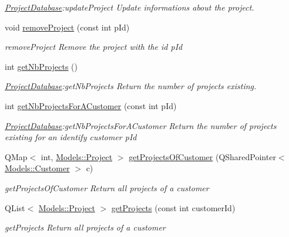 \begin{DoxyCompactItemize}
\begin{DoxyCompactList}\small\item\em \hyperlink{classDatabases_1_1ProjectDatabase}{Project\+Database}\+:update\+Project Update informations about the project. \end{DoxyCompactList}\item 
void \hyperlink{classDatabases_1_1ProjectDatabase_abdd5fcb1913c2d2f375a658f6656c522}{remove\+Project} (const int p\+Id)
\begin{DoxyCompactList}\small\item\em remove\+Project Remove the project with the id \textquotesingle{}p\+Id\textquotesingle{} \end{DoxyCompactList}\item 
int \hyperlink{classDatabases_1_1ProjectDatabase_aa486ad21f156a8ba7d08baef29e0aaea}{get\+Nb\+Projects} ()
\begin{DoxyCompactList}\small\item\em \hyperlink{classDatabases_1_1ProjectDatabase}{Project\+Database}\+:get\+Nb\+Projects Return the number of projects existing. \end{DoxyCompactList}\item 
int \hyperlink{classDatabases_1_1ProjectDatabase_a9e9a1fb58e4e90fcc568d1c171b863ff}{get\+Nb\+Projects\+For\+A\+Customer} (const int p\+Id)
\begin{DoxyCompactList}\small\item\em \hyperlink{classDatabases_1_1ProjectDatabase}{Project\+Database}\+:get\+Nb\+Projects\+For\+A\+Customer Return the number of projects existing for an identify customer {\itshape p\+Id} \end{DoxyCompactList}\item 
Q\+Map$<$ int, \hyperlink{classModels_1_1Project}{Models\+::\+Project} $>$ \hyperlink{classDatabases_1_1ProjectDatabase_acf044f95bd4df4e04bff9ef52d326704}{get\+Projects\+Of\+Customer} (Q\+Shared\+Pointer$<$ \hyperlink{classModels_1_1Customer}{Models\+::\+Customer} $>$ c)
\begin{DoxyCompactList}\small\item\em get\+Projects\+Of\+Customer Return all projects of a customer \end{DoxyCompactList}\item 
Q\+List$<$ \hyperlink{classModels_1_1Project}{Models\+::\+Project} $>$ \hyperlink{classDatabases_1_1ProjectDatabase_a75963715e3cae349fe3aa555f7226c56}{get\+Projects} (const int customer\+Id)
\begin{DoxyCompactList}\small\item\em get\+Projects Return all projects of a customer \end{DoxyCompactList}\item 

\end{DoxyCompactItemize}
